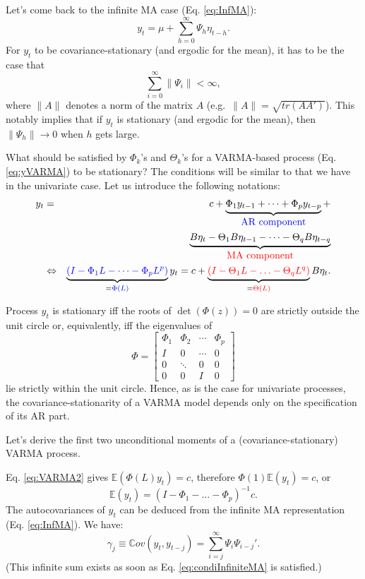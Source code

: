 \documentclass[
  11pt,
]{book}
\theoremstyle{definition}
\theoremstyle{definition}
\theoremstyle{definition}
\theoremstyle{definition}
\theoremstyle{remark}
\begin{document}
Let's come back to the infinite MA case (Eq. \eqref{eq:InfMA}):
\[
y_t = \mu + \sum_{h=0}^\infty \Psi_{h} \eta_{t-h}.
\]
For \(y_t\) to be covariance-stationary (and ergodic for the mean), it has to be the case that
\begin{equation}
\sum_{i=0}^\infty \|\Psi_i\| < \infty,\label{eq:condiInfiniteMA}
\end{equation}
where \(\|A\|\) denotes a norm of the matrix \(A\) (e.g.~\(\|A\|=\sqrt{tr(AA')}\)). This notably implies that if \(y_t\) is stationary (and ergodic for the mean), then \(\|\Psi_h\|\rightarrow 0\) when \(h\) gets large.

What should be satisfied by \(\Phi_k\)'s and \(\Theta_k\)'s for a VARMA-based process (Eq. \eqref{eq:yVARMA}) to be stationary? The conditions will be similar to that we have in the univariate case. Let us introduce the following notations:
\begin{eqnarray}
y_t &=& c + \underbrace{\Phi_1 y_{t-1} + \dots +\Phi_p y_{t-p}}_{{\color{blue}\mbox{AR component}}} +  \label{eq:VARMA2}\\
&&\underbrace{B \eta_t - \Theta_1 B \eta_{t-1} - \dots - \Theta_q B \eta_{t-q}}_{{\color{red}\mbox{MA component}}} \nonumber\\
&\Leftrightarrow& \underbrace{ {\color{blue}(I - \Phi_1 L - \dots - \Phi_p L^p)}}_{= {\color{blue}\Phi(L)}}y_t = c +  \underbrace{ {\color{red}(I - \Theta_1 L - \ldots - \Theta_q L^q)}}_{={\color{red}\Theta(L)}} B \eta_{t}. \nonumber
\end{eqnarray}

Process \(y_t\) is stationary iff the roots of \(\det(\Phi(z))=0\) are strictly outside the unit circle or, equivalently, iff the eigenvalues of
\begin{equation}
\Phi = \left[\begin{array}{cccc}
\Phi_{1} & \Phi_{2} & \cdots & \Phi_{p}\\
I & 0 & \cdots & 0\\
0 & \ddots & 0 & 0\\
0 & 0 & I & 0\end{array}\right]\label{eq:matrixPHI}
\end{equation}
lie strictly within the unit circle. Hence, as is the case for univariate processes, the covariance-stationarity of a VARMA model depends only on the specification of its AR part.

Let's derive the first two unconditional moments of a (covariance-stationary) VARMA process.

Eq. \eqref{eq:VARMA2} gives \(\mathbb{E}(\Phi(L)y_t)=c\), therefore \(\Phi(1)\mathbb{E}(y_t)=c\), or
\[
\mathbb{E}(y_t) = (I - \Phi_1 - \dots - \Phi_p)^{-1}c.
\]
The autocovariances of \(y_t\) can be deduced from the infinite MA representation (Eq. \eqref{eq:InfMA}). We have:
\[
\gamma_j \equiv \mathbb{C}ov(y_t,y_{t-j}) = \sum_{i=j}^\infty \Psi_i \Psi_{i-j}'.
\]
(This infinite sum exists as soon as Eq. \eqref{eq:condiInfiniteMA} is satisfied.)
\end{document}
